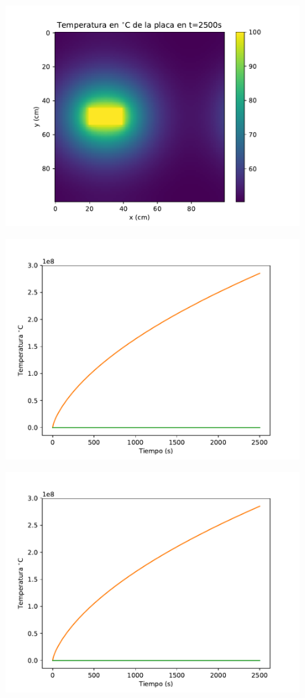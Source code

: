 \documentclass[12pt,letterpaper]{article}
\begin{document}
\begin{figure}[h]
\includegraphics{p2_2500.pdf}
\centering
\end{figure}

\begin{figure}[h]
\includegraphics{prom1.pdf}
\centering
\end{figure}

\begin{figure}[h]
\includegraphics{prom2.pdf}
\centering
\end{figure}


\vspace{0.3cm}
\end{document}
